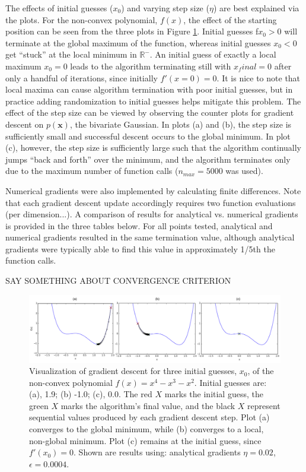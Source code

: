 \documentclass{article}
\begin{document}
The effects of initial guesses ($x_0$) and varying step size ($\eta$) are best explained via the plots.  For the non-convex polynomial, $f(x)$, the effect of the starting position can be seen from the three plots in Figure \ref{poly}.  Initial guesses f$x_0 > 0$ will terminate at the global maximum of the function, whereas initial guesses $x_0 < 0$ get ``stuck'' at the local minimum in $\mathbb{R}^-$.  An initial guess of exactly a local maximum $x_0 = 0$ leads to the algorithm terminating still with $x_final = 0$ after only a handful of iterations, since initially $f'(x=0)=0$.  It is nice to note that local maxima can cause algorithm termination with poor initial guesses, but in practice adding randomization to initial guesses helps mitigate this problem.  The effect of the step size can be viewed by observing the counter plots for gradient descent on $p(\mathbf{x})$, the bivariate Gaussian.  In plots (a) and (b), the step size is sufficiently small and successful descent occurs to the global minimum.  In plot (c), however, the step size is sufficiently large such that the algorithm continually jumps ``back and forth'' over the minimum, and the algorithm terminates only due to the maximum number of function calls ($n_{max}=5000$ was used).

Numerical gradients were also implemented by calculating finite differences.  Note that each gradient descent update accordingly requires two function evaluations (per dimension...).  A comparison of results for analytical vs. numerical gradients is provided in the three tables below.  For all points tested, analytical and numerical gradients resulted in the same termination value, although analytical gradients were typically able to find this value in approximately 1/5th the function calls.

SAY SOMETHING ABOUT CONVERGENCE CRITERION




\begin{figure}[!ht]
\centering
\includegraphics[scale=0.9]{polynomialdescent.pdf}
\caption{Visualization of gradient descent for three initial guesses, $x_0$, of the non-convex polynomial $f(x) = x^4 - x^3 -x^2$.  Initial guesses are: (a), 1.9; (b) -1.0; (c), 0.0.  The red $X$ marks the initial guess, the green $X$ marks the algorithm's final value, and the black $X$ represent sequential values produced by each gradient descent step. Plot (a) converges to the global minimum, while (b) converges to a local, non-global minimum.  Plot (c) remains at the initial guess, since $f'(x_0)=0$. Shown are results using: analytical gradients $\eta = 0.02$, $\epsilon = 0.0004$.}
\label{poly}
\end{figure}
\end{document}
